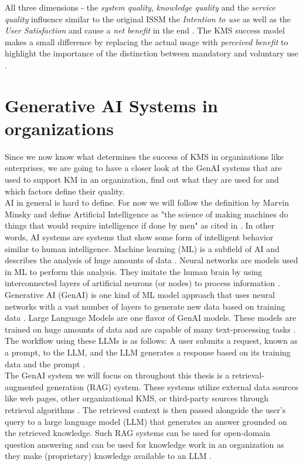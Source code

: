 \documentclass[
	english,
	ruledheaders=section,%
	class=report,%
	thesis={type=bachelor},%
	accentcolor=1b,%
	custommargins=true,%
	marginpar=false,%
	parskip=half-,%
	fontsize=11pt,%
	DIV=14,
]{tudapub}
\begin{document}
All three dimensions - the \textit{system quality}, \textit{knowledge quality} and the \textit{service quality} influence similar to the original ISSM the \textit{Intention to use} as well as the \textit{User Satisfaction} and cause a \textit{net benefit} in the end \parencite[p.~56]{Jennex2006}. The KMS success model makes a small difference by replacing the actual usage with \textit{perceived benefit} to highlight the importance of the distinction between mandatory and voluntary use \parencite[p.~55]{Jennex2006}.
\section{Generative AI Systems in organizations}
Since we now know what determines the success of KMS in organizations like enterprises, we are going to have a closer look at the GenAI systems that are used to support KM in an organization, find out what they are used for and which factors define their quality.\\
AI in general is hard to define. For now we will follow the definition by Marvin Minsky and define Artificial Intelligence as "the science of making machines do things that would require intelligence if done by men" \parencite{minsky:original} as cited in \parencite{dennis:2025}. In other words, AI systems are systems that show some form of intelligent behavior similar to human intelligence. Machine learning (ML) is a subfield of AI and describes the analysis of huge amounts of data \parencite[p.~573]{Lund2023}. Neural networks are models used in ML to perform this analysis. They imitate the human brain by using interconnected layers of artificial neurons (or nodes) to process information \parencite[p.~573]{Lund2023}. Generative AI (GenAI) is one kind of ML model approach that uses neural networks with a vast number of layers to generate new data based on training data \parencite[p.~574]{Lund2023}.
Large Language Models are one flavor of GenAI models. These models are trained on huge amounts of data and are capable of many text-processing tasks \parencite[p.~2]{Naveed2024}. The workflow using these LLMs is as follows: A user submits a request, known as a prompt, to the LLM, and the LLM generates a response based on its training data and the prompt \parencite[p.~575]{Lund2023}.\\
The GenAI system we will focus on throughout this thesis is a retrieval-augmented generation (RAG) system. These systems utilize external data sources like web pages, other organizational KMS, or third-party sources through retrieval algorithms \parencite{AWS_RAG}. The retrieved context is then passed alongside the user's query to a large language model (LLM) that generates an answer grounded on the retrieved knowledge. Such RAG systems can be used for open-domain question answering and can be used for knowledge work in an organization as they make (proprietary) knowledge available to an LLM \parencite[p.~9459]{Lewis2020}.\\
\end{document}
